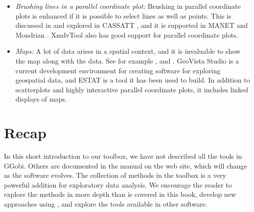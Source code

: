 \begin{itemize}

\item {\em Brushing lines in a parallel coordinate plot:} Brushing in
parallel coordinate plots is enhanced if it is possible to select
lines as well as points. This is discussed in  and
explored in CASSATT \cite{UVW03}, and it is supported in MANET
\cite{UHS96} and Mondrian \cite{Theus02}. XmdvTool also has good
support for parallel coordinate plots.


 
\item {\em Maps:} A lot of data arises in a spatial context, and it is
invaluable to show the map along with the data. See for example
, and .  GeoVista Studio
\cite{TaGa02} is a current development environment for creating
software for exploring geospatial data, and ESTAT is a tool it has
been used to build.  In addition to scatterplots and highly
interactive parallel coordinate plots, it includes linked displays of
maps.

\end{itemize}


\section{Recap}

In this short introduction to our toolbox, we have not described all
the tools in GGobi.  Others are documented in the manual on the
web site, which will change as the software evolves. The collection of
methods in the toolbox is a very powerful addition for exploratory
data analysis. We encourage the reader to explore the methods in
more depth than is covered in this book, develop new approaches using
, and explore the tools available in other software.

